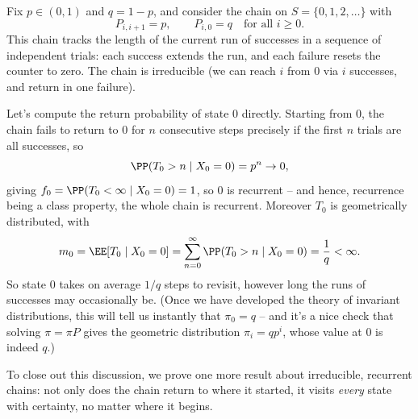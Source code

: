 \begin{example}
	Fix $p \in (0, 1)$ and $q = 1 - p$, and consider the chain on $S = \{0, 1, 2, \dots\}$ with
	$$
	P_{i, i + 1} = p, \qquad P_{i, 0} = q \quad \text{for all } i \geq 0.
	$$
	This chain tracks the length of the current run of successes in a sequence of independent trials: each success extends the run, and each failure resets the counter to zero. The chain is irreducible (we can reach $i$ from 0 via $i$ successes, and return in one failure).

	\begin{center}
	\end{center}

	Let's compute the return probability of state 0 directly. Starting from 0, the chain fails to return to 0 for $n$ consecutive steps precisely if the first $n$ trials are all successes, so
	$$
	\PP(T_0 > n \mid X_0 = 0) = p^n \rightarrow 0,
	$$
	giving $f_0 = \PP(T_0 < \infty \mid X_0 = 0) = 1$, so 0 is recurrent -- and hence, recurrence being a class property, the whole chain is recurrent. Moreover $T_0$ is geometrically distributed, with
	$$
	m_0 = \EE[T_0 \mid X_0 = 0] = \sum_{n = 0}^{\infty} \PP(T_0 > n \mid X_0 = 0) = \frac{1}{q} < \infty.
	$$
	So state 0 takes on average $1/q$ steps to revisit, however long the runs of successes may occasionally be. (Once we have developed the theory of invariant distributions, this will tell us instantly that $\pi_0 = q$ -- and it's a nice check that solving $\pi = \pi P$ gives the geometric distribution $\pi_i = qp^i$, whose value at 0 is indeed $q$.)
\end{example}

To close out this discussion, we prove one more result about irreducible, recurrent chains: not only does the chain return to where it started, it visits \emph{every} state with certainty, no matter where it begins.

